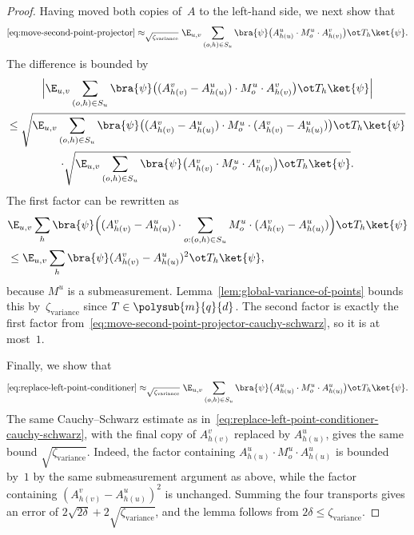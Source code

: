 \begin{proof}
  Having moved both copies of~$A$ to the left-hand side, we next show that
  \begin{equation}\label{eq:replace-left-point-conditioner}
    \eqref{eq:move-second-point-projector}
    \approx_{\sqrt{\zeta_{\mathrm{variance}}}}
    \E_{u,v} \sum_{(o, h) \in S_{u}} \bra{\psi} \bigl(A^{u}_{h(u)} \cdot M^{u}_o \cdot A^{v}_{h(v)}\bigr) \ot T_h  \ket{\psi}.
  \end{equation}
  The difference is bounded by
  \begin{multline}\label{eq:replace-left-point-conditioner-cauchy-schwarz}
    \Big|\E_{u,v} \sum_{(o, h) \in S_{u}} \bra{\psi} \bigl((A^{v}_{h(v)} - A^{u}_{h(u)}) \cdot M^{u}_o \cdot A^{v}_{h(v)}\bigr) \ot T_h  \ket{\psi}\Big|\\
    \leq
    \sqrt{\E_{u,v} \sum_{(o, h) \in S_{u}} \bra{\psi} \bigl((A^{v}_{h(v)} - A^{u}_{h(u)}) \cdot M^{u}_o \cdot (A^{v}_{h(v)} - A^{u}_{h(u)})\bigr) \ot T_h  \ket{\psi}}\\
    \cdot \sqrt{\E_{u,v} \sum_{(o, h) \in S_{u}} \bra{\psi} \bigl(A^{v}_{h(v)} \cdot M^{u}_o \cdot A^{v}_{h(v)}\bigr) \ot T_h  \ket{\psi}}.
  \end{multline}
  The first factor can be rewritten as
  \begin{align*}
    &\E_{u,v} \sum_h \bra{\psi}
      \Bigl((A^v_{h(v)} - A^u_{h(u)}) \cdot
      \sum_{o:(o,h)\in S_u} M^u_o \cdot
      (A^v_{h(v)} - A^u_{h(u)})\Bigr) \ot T_h \ket{\psi} \\
    &\le \E_{u,v} \sum_h \bra{\psi}
      (A^v_{h(v)} - A^u_{h(u)})^2 \ot T_h \ket{\psi},
  \end{align*}
  because $M^u$ is a submeasurement. Lemma~\ref{lem:global-variance-of-points}
  bounds this by~$\zeta_{\mathrm{variance}}$ since $T \in \polysub{m}{q}{d}$. The
  second factor is exactly the first factor
  from~\eqref{eq:move-second-point-projector-cauchy-schwarz},
  so it is at most~$1$.

  Finally, we show that
  \begin{equation}\label{eq:replace-right-point-conditioner}
    \eqref{eq:replace-left-point-conditioner}
    \approx_{\sqrt{\zeta_{\mathrm{variance}}}}
    \E_{u,v} \sum_{(o, h) \in S_{u}} \bra{\psi} \bigl(A^{u}_{h(u)} \cdot M^{u}_o \cdot A^{u}_{h(u)}\bigr) \ot T_h  \ket{\psi}.
  \end{equation}
  The same Cauchy--Schwarz estimate
  as in~\eqref{eq:replace-left-point-conditioner-cauchy-schwarz}, with
  the final copy of $A^v_{h(v)}$ replaced by $A^u_{h(u)}$, gives the same bound
  $\sqrt{\zeta_{\mathrm{variance}}}$. Indeed, the factor containing
  $A^u_{h(u)} \cdot M^u_o \cdot A^u_{h(u)}$ is bounded by~$1$ by the same
  submeasurement argument as above, while the factor containing
  $(A^v_{h(v)} - A^u_{h(u)})^2$ is unchanged. Summing the four transports gives an
  error of $2\sqrt{2\delta} + 2\sqrt{\zeta_{\mathrm{variance}}}$, and the lemma
  follows from $2\delta \leq \zeta_{\mathrm{variance}}$.
\end{proof}

